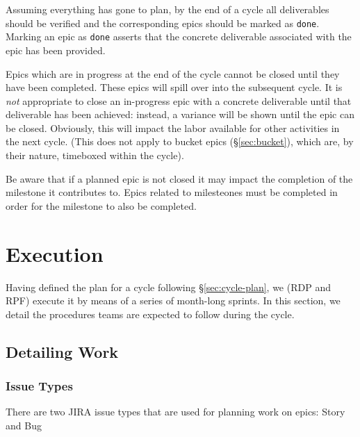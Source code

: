 \begin{itemize}
Assuming everything has gone to plan, by the end of a \gls{cycle} all deliverables should be verified and the corresponding \glspl{epic} should be marked as \texttt{done}.
Marking an \gls{epic} as \texttt{done} asserts that the concrete deliverable associated with the \gls{epic} has been provided.

Epics which are in progress at the end of the \gls{cycle} cannot be closed until they have been completed.
These \glspl{epic} will spill over into the subsequent \gls{cycle}.
It is \emph{not} appropriate to close an in-progress \gls{epic} with a concrete deliverable until that deliverable has been achieved: instead, a variance will be shown until the \gls{epic} can be closed.
Obviously, this will impact the labor available for other activities in the next \gls{cycle}.
(This does not apply to bucket \glspl{epic} (\S\ref{sec:bucket}), which are, by their nature, \gls{timebox}ed within the \gls{cycle}).

Be aware that if a planned epic is not closed it may impact the completion of the milestone it contributes to.  Epics related to milesteones must be completed in order for the milestone to also be completed.


\section{Execution} \label{sec:execution}

Having defined the plan for a \gls{cycle} following \S\ref{sec:cycle-plan}, we (RDP and RPF) execute it by means of a series of month-long sprints.
In this section, we detail the procedures teams are expected to follow during the \gls{cycle}.

\subsection{Detailing Work}
\label{sec:detailing-work}

\subsubsection{Issue Types}\label{issue-types}

There are two \gls{JIRA} issue types that are used for planning work on epics: Story and Bug


\end{itemize}
